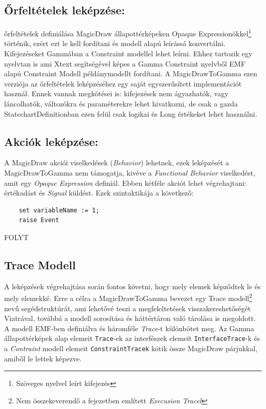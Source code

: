\subsection{Őrfeltételek leképzése:} őrfeltételek definiálása MagicDraw állapottérképeken Opaque Expressionökkel\footnote{Szöveges nyelvel leírt kifejezés} történik, ezért ezt le kell fordítani és modell alapú leírássá konvertálni. Kifejezéseket Gammában a Constraint modellel lehet leírni. Ehhez tartozik egy nyelvtan is ami Xtext segítségével képes a Gamma Constraint nyelvből EMF alapú Constraint Modell példánymodellt fordítani. A MagicDrawToGamma ezen verziója az őrfeltételek leképzéséhez egy saját egyszerűsített implementációt használ. Ennek vannak megkötései is: kifejezések nem ágyazhatók, vagy láncolhatók, változókra és paraméterekre lehet hivatkozni, de csak a gazda StatechartDefinitionban ezen felül csak logikai és Long értékeket lehet használni.

\subsection{Akciók leképzése:} A MagicDraw akciói viselkedések (\emph{Behavior}) lehetnek, ezek leképzését a MagicDrawToGamma nem támogatja, kivéve a \emph{Functional Behavior} viselkedést, amit egy \emph{Opaque Expression} definiál. Ebben kétféle akciót lehet végrehajtani: értékadást és \emph{Signal} küldést. Ezek szintaktikája a következő:

\begin{lstlisting}
	set variableName := 1;
	raise Event
\end{lstlisting}

FOLYT


\subsection{Trace Modell}
\label{sec:trace_model}
A leképzések végrehajtása során fontos követni, hogy mely elemek képződtek le és mely elemekké. Erre a célra a MagicDrawToGamma bevezet egy Trace modell\footnote{Nem összekeverendő a  fejezetben említett \emph{Execusion Tracel}} nevű segédstruktúrát, ami lehetővé teszi a megfeleltetések visszakereshetőségét Viatrával, továbbá a modell sorosítása és háttértáron való tárolása is megoldott. A modell EMF-ben definiálva és  háromféle \emph{Trace}-t különbötet meg. Az Gamma állapottérképek alap elemeit \verb+Trace+-ek az interfészek elemeit \verb+InterfaceTrace+-k és a \emph{Contraint} modell elemeit \verb+ConstraintTracek+ kötik össze MagicDraw párjukkal, amiből le lettek képezve.


